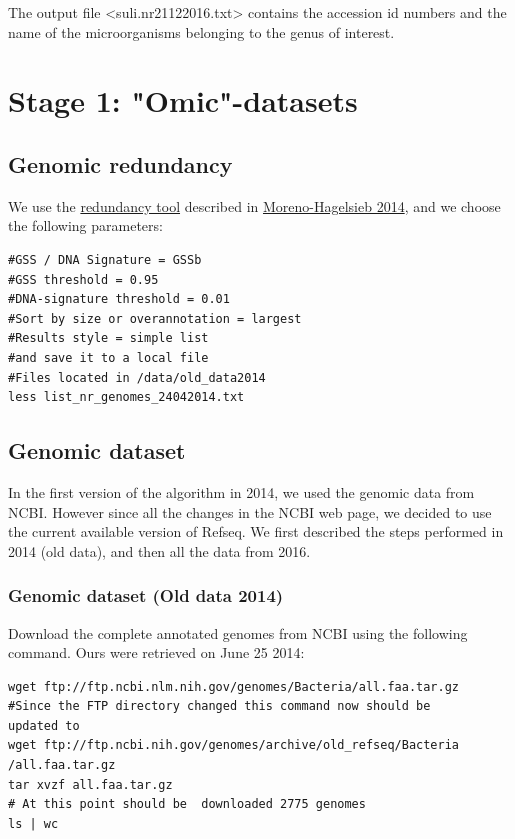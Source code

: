 \documentclass[12pt]{report}
\begin{document}
The output file <suli.nr21122016.txt> contains the accession id numbers and the
name of the microorganisms belonging to the genus of interest. 

\section{Stage 1: "Omic"-datasets}
\label{stage1}


\subsection{Genomic redundancy}
We use the
\href{http://microbiome.wlu.ca/research/redundancy/redundancy.cgi}{redundancy
tool}  described in
\href{http://bioinformatics.oxfordjournals.org/content/early/2013/02/27/bioinformatics.btt064.full}{Moreno-Hagelsieb
2014}, and we choose the following parameters:
\begin{verbatim}
#GSS / DNA Signature = GSSb
#GSS threshold = 0.95
#DNA-signature threshold = 0.01
#Sort by size or overannotation = largest
#Results style = simple list
#and save it to a local file 
#Files located in /data/old_data2014
less list_nr_genomes_24042014.txt  
\end{verbatim}

\subsection{Genomic dataset}
In the first version of the algorithm in 2014, we used the genomic data from
NCBI. However since all the changes in the NCBI web page, we decided to use the
current available version of Refseq. We first described the steps performed in
2014 (old data), and then all the data from 2016.
\subsubsection{Genomic dataset (Old data 2014)}
Download the complete  annotated genomes from NCBI using the following command.
Ours were retrieved on June 25 2014:  

\begin{verbatim}
wget ftp://ftp.ncbi.nlm.nih.gov/genomes/Bacteria/all.faa.tar.gz
#Since the FTP directory changed this command now should be 
updated to
wget ftp://ftp.ncbi.nih.gov/genomes/archive/old_refseq/Bacteria
/all.faa.tar.gz
tar xvzf all.faa.tar.gz
# At this point should be  downloaded 2775 genomes
ls | wc 
\end{verbatim}
\end{document}
